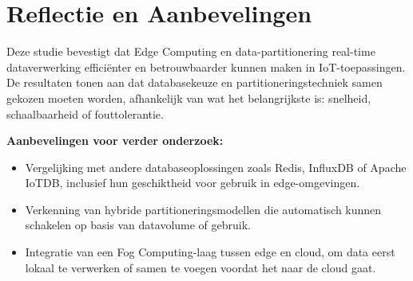 \section{Reflectie en Aanbevelingen}

Deze studie bevestigt dat Edge Computing en data-partitionering real-time dataverwerking efficiënter en betrouwbaarder kunnen maken in IoT-toepassingen. De resultaten tonen aan dat databasekeuze en partitioneringstechniek samen gekozen moeten worden, afhankelijk van wat het belangrijkste is: snelheid, schaalbaarheid of fouttolerantie.

\textbf{Aanbevelingen voor verder onderzoek:}
\begin{itemize}
    \item Vergelijking met andere databaseoplossingen zoals Redis, InfluxDB of Apache IoTDB, inclusief hun geschiktheid voor gebruik in edge-omgevingen.
    \item Verkenning van hybride partitioneringsmodellen die automatisch kunnen schakelen op basis van datavolume of gebruik.
    \item Integratie van een Fog Computing-laag tussen edge en cloud, om data eerst lokaal te verwerken of samen te voegen voordat het naar de cloud gaat.
\end{itemize}